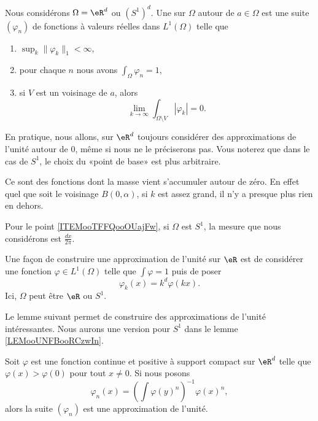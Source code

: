 \begin{definition}       \label{DEFooEFGNooOREmBb}
Nous considérons \( \Omega=\eR^d\) ou \( (S^1)^d\). Une  sur \( \Omega\) autour de \( a\in \Omega\) est une suite \( (\varphi_n)\) de fonctions à valeurs réelles dans \( L^1(\Omega)\) telle que
    \begin{enumerate}
        \item
            $\sup_k \| \varphi_k \|_1 <\infty$,
        \item   \label{ITEMooGVRQooHDbrcf}
            pour chaque \( n\) nous avons $\int_{\Omega}\varphi_n=1$,
        \item
            si \( V\) est un voisinage de \( a\), alors
            \begin{equation}
                \lim_{k\to \infty} \int_{\Omega\setminus V}| \varphi_k |=0.
            \end{equation}
    \end{enumerate}
    En pratique, nous allons, sur \( \eR^d\) toujours considérer des approximations de l'unité autour de \( 0\), même si nous ne le préciserons pas. Vous noterez que dans le cas de \( S^1\), le choix du «point de base» est plus arbitraire.
\end{definition}
Ce sont des fonctions dont la masse vient s'accumuler autour de zéro. En effet quel que soit le voisinage \( B(0,\alpha)\), si \( k\) est assez grand, il n'y a presque plus rien en dehors.

Pour le point \eqref{ITEMooTFFQooOUajFw}, si \( \Omega\) est \( S^1\), la mesure que nous considérons est \( \frac{ dx }{ 2\pi }\).


\begin{example}
    Une façon de construire une approximation de l'unité sur \( \eR\) est de considérer une fonction \( \varphi\in L^1(\Omega)\) telle que \( \int\varphi=1\) puis de poser
    \begin{equation}
        \varphi_k(x)=k^d\varphi(kx).
    \end{equation}
    Ici, \( \Omega\) peut être \( \eR\) ou \( S^1\).
\end{example}

Le lemme suivant permet de construire des approximations de l'unité intéressantes. Nous aurons une version pour \( S^1\) dans le lemme \ref{LEMooUNFBooRCzwIn}.
\begin{lemma}   \label{LemCNjIYhv}
    Soit \( \varphi\) est une fonction continue et positive à support compact sur \( \eR^d\) telle que \( \varphi(x)>\varphi(0)\) pour tout \( x\neq 0\). Si nous posons
    \begin{equation}
        \varphi_n(x)=\left( \int\varphi(y)^n \right)^{-1}\varphi(x)^n,
    \end{equation}
    alors la suite \( (\varphi_n)\) est une approximation de l'unité.
\end{lemma}

